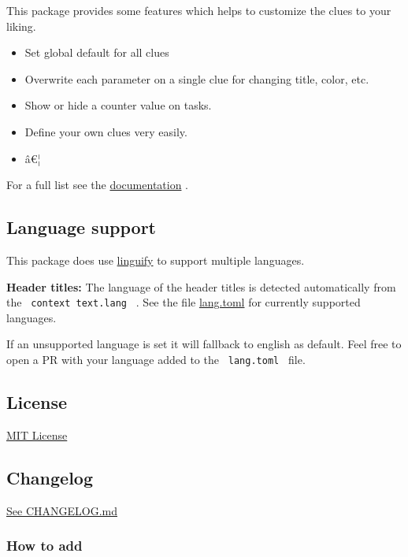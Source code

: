 This package provides some features which helps to customize the clues
to your liking.

\begin{itemize}
\tightlist
\item
  Set global default for all clues
\item
  Overwrite each parameter on a single clue for changing title, color,
  etc.
\item
  Show or hide a counter value on tasks.
\item
  Define your own clues very easily.
\item
  â€¦
\end{itemize}

For a full list see the
\href{https://github.com/jomaway/typst-gentle-clues/blob/main/docs.pdf}{documentation}
.

\subsection{Language support}\label{language-support}

This package does use
\href{https://github.com/jomaway/typst-linguify}{linguify} to support
multiple languages.

\textbf{Header titles:} The language of the header titles is detected
automatically from the \texttt{\ context\ text.lang\ } . See the file
\href{https://github.com/jomaway/typst-gentle-clues/blob/main/lib/lang.toml}{lang.toml}
for currently supported languages.

If an unsupported language is set it will fallback to english as
default. Feel free to open a PR with your language added to the
\texttt{\ lang.toml\ } file.

\subsection{License}\label{license}

\href{https://github.com/typst/packages/raw/main/packages/preview/gentle-clues/1.0.0/LICENSE}{MIT
License}

\subsection{Changelog}\label{changelog}

\href{https://github.com/typst/packages/raw/main/packages/preview/gentle-clues/1.0.0/CHANGELOG.md}{See
CHANGELOG.md}

\subsubsection{How to add}\label{how-to-add}

